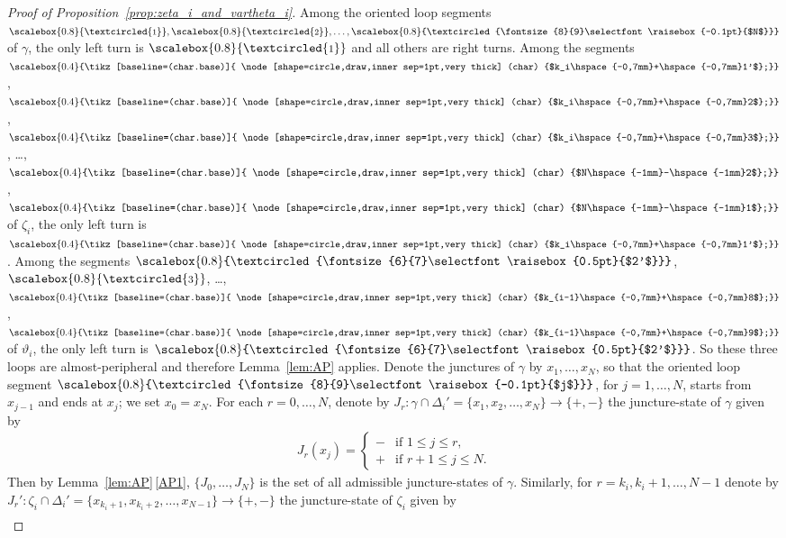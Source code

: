 \documentclass[pdftex]{sigma}
\numberwithin{equation}{section}
\theoremstyle{definition}
\newcommand{\circled}[1]{\scalebox{0.8}{\textcircled{\fontsize{8}{9}\selectfont \raisebox{-0.1pt}{#1}}}}
\newcommand{\circledd}[1]{\scalebox{0.8}{\textcircled{\fontsize{6}{7}\selectfont \raisebox{0.5pt}{#1}}}}
\newcommand*\circleddd[1]{\scalebox{0.4}{\tikz[baseline=(char.base)]{
 \node[shape=circle,draw,inner sep=1pt,very thick] (char) {#1};}}}
\begin{document}
\begin{proof}[Proof of Proposition~\ref{prop:zeta_i_and_vartheta_i}] Among the oriented loop segments $\circled{1},\circled{2},\dots,\circled{$N$}$ of $\gamma$, the only left turn is $\circled{1}$ and all others are right turns. Among the segments $\circleddd{$k_i\hspace{-0,7mm}+\hspace{-0,7mm}1'$}$, $\circleddd{$k_i\hspace{-0,7mm}+\hspace{-0,7mm}2$}$, $\circleddd{$k_i\hspace{-0,7mm}+\hspace{-0,7mm}3$}$, \dots, $\circleddd{$N\hspace{-1mm}-\hspace{-1mm}2$}$, $\circleddd{$N\hspace{-1mm}-\hspace{-1mm}1$}$ of $\zeta_i$, the only left turn is $\circleddd{$k_i\hspace{-0,7mm}+\hspace{-0,7mm}1'$}$. Among the segments $\circledd{$2'$}$, $\circled{3}$, \dots, $\circleddd{$k_{i-1}\hspace{-0,7mm}+\hspace{-0,7mm}8$}$, $\circleddd{$k_{i-1}\hspace{-0,7mm}+\hspace{-0,7mm}9$}$ of $\vartheta_i$, the only left turn is $\circledd{$2'$}$. So these three loops are almost-peripheral and therefore Lemma~\ref{lem:AP} applies. Denote the junctures of $\gamma$ by $x_1, \dots,x_N$, so that the oriented loop segment $\circled{$j$}$, for $j=1,\dots,N$, starts from $x_{j-1}$ and ends at $x_j$; we set $x_0=x_N$. For each $r=0,\dots,N$, denote by $J_r : \gamma \cap \Delta_i' = \{x_1,x_2,\dots,x_N\} \to \{+,-\}$ the juncture-state of $\gamma$ given by
\begin{align*}
J_r(x_j) = \begin{cases}
- & \mbox{if $1\le j \le r$}, \\
+ & \mbox{if $r+1 \le j \le N$}.
\end{cases}
\end{align*}
Then by Lemma~\ref{lem:AP}\,\ref{AP1}, $\{J_0,\dots,J_N\}$ is the set of all admissible juncture-states of $\gamma$. Similarly, for $r=k_i,k_i+1,\dots,N-1$ denote by $J_r' \colon \zeta_i \cap \Delta_i' = \{x_{k_i+1},x_{k_i+2},\dots,x_{N-1}\} \to \{+,-\}$ the juncture-state of $\zeta_i$ given by
\begin{align*}

\end{align*}
\end{proof}
\end{document}
